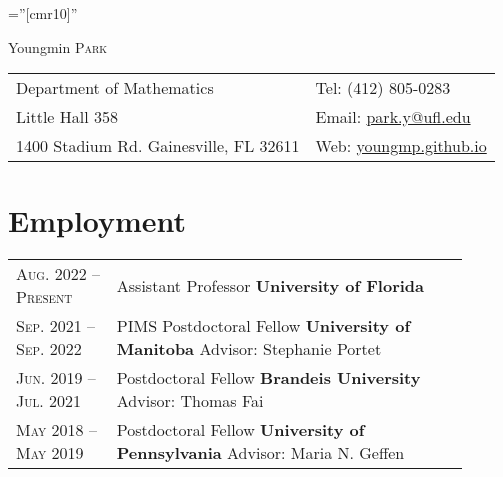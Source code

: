 \documentclass[a4paper,10pt]{article}
\begin{document}
\pagestyle{empty} %

\font\fb=''[cmr10]'' %

\par{\centering
		{\Large Youngmin \textsc{Park}
	}\par}



\begin{center}
\begin{tabularx}{.8\textwidth}{Xl}

Department of Mathematics & Tel: (412) 805-0283 \\
Little Hall 358 & Email: \href{mailto:park.y@ufl.edu}{park.y@ufl.edu}\\
1400 Stadium Rd. Gainesville, FL 32611  & Web: \href{https://youngmp.github.io}{youngmp.github.io}\\
\end{tabularx}
\end{center}


\section{Employment}
\begin{tabular}{p{0.2\linewidth}p{0.7\linewidth}}
 \textsc{Aug. 2022}  -- \textsc{Present}  & Assistant Professor \textbf{University of Florida}\vspace{8pt}\\
 \textsc{Sep. 2021}  -- \textsc{Sep. 2022}  & PIMS Postdoctoral Fellow \textbf{University of Manitoba}\newline
 \small Advisor: Stephanie Portet\vspace{8pt}\\
 \textsc{Jun. 2019}  -- \textsc{Jul. 2021}  & Postdoctoral Fellow \textbf{Brandeis University}\newline
 \small Advisor: Thomas Fai\vspace{8pt}\\
 \textsc{May 2018}  -- \textsc{May 2019}   & Postdoctoral Fellow \textbf{University of Pennsylvania}\newline
\small Advisor: Maria N. Geffen\\
\end{tabular}
\end{document}
